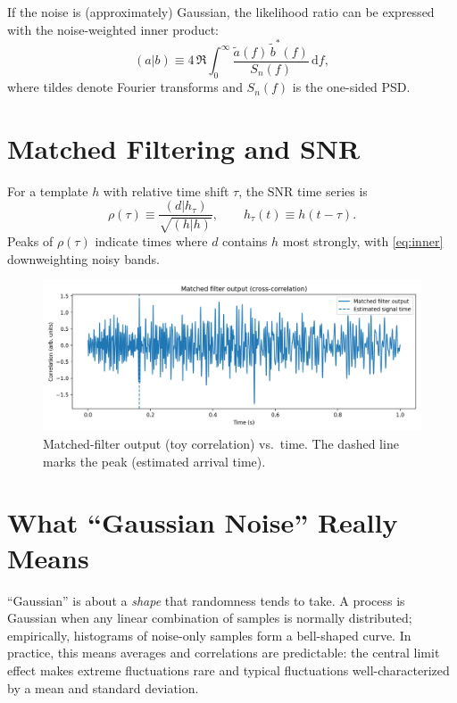 \documentclass[11pt,a4paper]{article}
\begin{document}
If the noise is (approximately) Gaussian, the likelihood ratio can be expressed with the noise-weighted inner product:
\begin{equation}
(a|b) \equiv 4\,\Re \int_{0}^{\infty} \frac{\tilde a(f)\,\tilde b^{*}(f)}{S_n(f)}\,\mathrm{d}f, \label{eq:inner}
\end{equation}
where tildes denote Fourier transforms and $S_n(f)$ is the one-sided PSD.

\section{Matched Filtering and SNR}
For a template $h$ with relative time shift $\tau$, the SNR time series is
\begin{equation}
\rho(\tau) \equiv \frac{(d | h_\tau)}{\sqrt{(h|h)}}, \qquad
h_\tau(t) \equiv h(t-\tau). \label{eq:snr}
\end{equation}
Peaks of $\rho(\tau)$ indicate times where $d$ contains $h$ most strongly, with \eqref{eq:inner} downweighting noisy bands.

\begin{figure}[h!]\centering
\includegraphics[width=0.95\linewidth]{fig2_correlation.png}
\caption{Matched-filter output (toy correlation) vs.\ time. The dashed line marks the peak (estimated arrival time).}
\label{fig:corr}
\end{figure}

\section{What ``Gaussian Noise'' Really Means}
``Gaussian'' is about a \emph{shape} that randomness tends to take. A process is Gaussian when any linear combination of samples is normally distributed; empirically, histograms of noise-only samples form a bell-shaped curve. In practice, this means averages and correlations are predictable: the central limit effect makes extreme fluctuations rare and typical fluctuations well-characterized by a mean and standard deviation.
\end{document}
